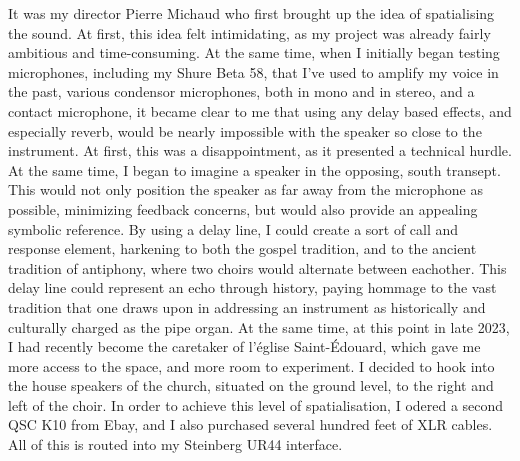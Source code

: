 \documentclass[12pt,twoside,maitrise]{dms_ks}
\theoremstyle{definition}
\begin{document}
It was my director Pierre Michaud who first brought up the idea of spatialising the sound. 
At first, this idea felt intimidating, as my project was already fairly ambitious and time-consuming. 
At the same time, when I initially began testing microphones, including my Shure Beta 58, that I've used to amplify my voice in the past, various condensor microphones, both in mono and in stereo, and a contact microphone, it became clear to me that using any delay based effects, and especially reverb, would be nearly impossible with the speaker so close to the instrument. 
At first, this was a disappointment, as it presented a technical hurdle. 
At the same time, I began to imagine a speaker in the opposing, south transept. 
This would not only position the speaker as far away from the microphone as possible, minimizing feedback concerns, but would also provide an appealing symbolic reference. 
By using a delay line, I could create a sort of call and response element, harkening to both the gospel tradition, and to the ancient tradition of antiphony, where two choirs would alternate between eachother. 
This delay line could represent an echo through history, paying hommage to the vast tradition that one draws upon in addressing an instrument as historically and culturally charged as the pipe organ. 
At the same time, at this point in late 2023, I had recently become the caretaker of l'église Saint-Édouard, which gave me more access to the space, and more room to experiment. 
I decided to hook into the house speakers of the church, situated on the ground level, to the right and left of the choir. 
In order to achieve this level of spatialisation, I odered a second QSC K10 from Ebay, and I also purchased several hundred feet of XLR cables. 
All of this is routed into my Steinberg UR44 interface.
\end{document}
